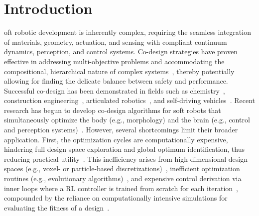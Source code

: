 \section{Introduction}
oft robotic development is inherently complex, requiring the seamless integration of materials, geometry, actuation, and sensing with compliant continuum dynamics, perception, and control systems. Co-design strategies have proven effective in addressing multi-objective problems and accommodating the compositional, hierarchical nature of complex systems~\citep{zardini2023co}, thereby potentially allowing for finding the delicate balance between safety and performance. Successful co-design has been demonstrated in fields such as chemistry~\citep{norskov2009towards,vaissier2018computational}, construction engineering~\citep{knippers2021integrative}, articulated robotics~\citep{ha2018computational,zhao2020robogrammar}, and self-driving vehicles~\citep{zardini2021co}.
% 
Recent research has begun to develop co-design algorithms for soft robots that simultaneously optimize the body (e.g., morphology) and the brain (e.g., control and perception systems)~\citep{van2018spatial, spielberg2019learning, chen2020design, bhatia2021evolution, spielberg2021co, wang2023preco, medvet2021biodiversity, wang2022curriculum, junge2022leveraging, legrand2023reconfigurable, wang2024diffusebot, navez2024contributions}. However, several shortcomings limit their broader application. First, the optimization cycles are computationally expensive, hindering full design space exploration and global optimum identification, thus reducing practical utility~\citep{chen2020design}. This inefficiency arises from high-dimensional design spaces (e.g., voxel- or particle-based discretizations)~\citep{spielberg2019learning, medvet2021biodiversity, medvet2022impact, wang2022curriculum, legrand2023reconfigurable, wang2023softzoo, wang2023preco, wang2024diffusebot}, inefficient optimization routines (e.g., evolutionary algorithms)~\citep{chen2020design, rieffel2014growing, hiller2012automatic, bhatia2021evolution, medvet2021biodiversity, medvet2022impact}, and expensive control derivation via inner loops where a \gls{RL} controller is trained from scratch for each iteration~\citep{bhatia2021evolution, wang2022curriculum, wang2023softzoo, wang2023preco}, compounded by the reliance on computationally intensive simulations for evaluating the fitness of a design~\citep{spielberg2019learning, medvet2021biodiversity, medvet2022impact, wang2022curriculum, legrand2023reconfigurable, wang2023softzoo, wang2023preco, wang2024diffusebot}.

